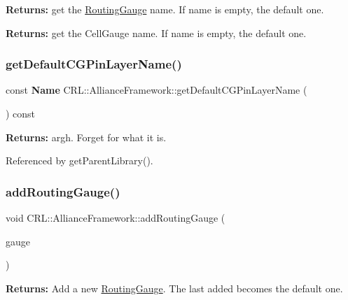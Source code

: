 {\bfseries Returns\+:} get the \hyperlink{classCRL_1_1RoutingGauge}{Routing\+Gauge} {\ttfamily name}. If {\ttfamily name} is empty, the default one.

{\bfseries Returns\+:} get the Cell\+Gauge {\ttfamily name}. If {\ttfamily name} is empty, the default one. \mbox{\label{classCRL_1_1AllianceFramework_ae2bf20fc92a4684bebdab666c68c8aab}} 
\subsubsection{\texorpdfstring{get\+Default\+C\+G\+Pin\+Layer\+Name()}{getDefaultCGPinLayerName()}}
{\footnotesize\ttfamily const \textbf{ Name} C\+R\+L\+::\+Alliance\+Framework\+::get\+Default\+C\+G\+Pin\+Layer\+Name (\begin{DoxyParamCaption}{ }\end{DoxyParamCaption}) const\hspace{0.3cm}{\ttfamily [inline]}}

{\bfseries Returns\+:} argh. Forget for what it is. 

Referenced by get\+Parent\+Library().

\mbox{\label{classCRL_1_1AllianceFramework_ae182fd150c695fd24c1b10ddbc377b32}} 
\subsubsection{\texorpdfstring{add\+Routing\+Gauge()}{addRoutingGauge()}}
{\footnotesize\ttfamily void C\+R\+L\+::\+Alliance\+Framework\+::add\+Routing\+Gauge (\begin{DoxyParamCaption}\item[{\hyperlink{classCRL_1_1RoutingGauge}{Routing\+Gauge} $\ast$}]{gauge }\end{DoxyParamCaption})}

{\bfseries Returns\+:} Add a new \hyperlink{classCRL_1_1RoutingGauge}{Routing\+Gauge}. The last added becomes the default one. \mbox{\label{classCRL_1_1AllianceFramework_aab16db33a0ce2e3bce5739f7cadb3d5a}} 
